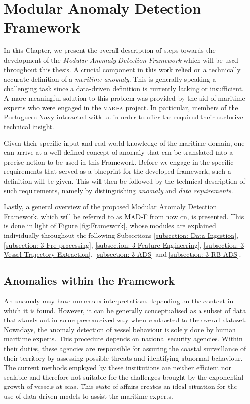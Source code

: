 \chapter{Modular Anomaly Detection Framework}
\label{chapter:Chapter 3}

In this Chapter, we present the overall description of steps towards the development of the \emph{Modular Anomaly Detection Framework} which will be used throughout this thesis. 
A crucial component in this work relied on a technically accurate definition of a \emph{maritime anomaly}. This is generally speaking a challenging task since a data-driven definition is currently lacking or insufficient. A more meaningful solution to this problem was provided by the aid of maritime experts who were engaged in the \textsc{marisa} project. In particular, members of the Portuguese Navy interacted with us in order to offer the required their exclusive technical insight.

Given their specific input and real-world knowledge of the maritime domain, one can arrive at a well-defined concept of anomaly that can be translated into a precise notion to be used in this Framework. Before we engage in the specific requirements that served as a blueprint for the developed framework, such a definition will be given. This will then be followed by the technical description of such requirements, namely by distinguishing \emph{anomaly} and \emph{data requirements}.

Lastly, a general overview of the proposed Modular Anomaly Detection Framework, which will be referred to as MAD-F from now on, is presented. This is done in light of Figure \ref{fig:Framework}, whose modules are explained individually throughout the following Subsections \ref{subsection: Data Ingestion}, \ref{subsection: 3 Pre-processing}, \ref{subsection: 3 Feature Engineering},  \ref{subsection: 3 Vessel Trajectory Extraction}, \ref{subsection: 3 ADS} and \ref{subsection: 3 RB-ADS}.


\section{Anomalies within the Framework}
\label{section: Framework Requirements}
An anomaly may have numerous interpretations depending on the context in which it is found. However, it can be generally conceptualised as a subset of data that stands out in some preconceived way when contrasted to the overall dataset. Nowadays, the anomaly detection of vessel behaviour is solely done by human maritime experts. This procedure depends on national security agencies. Within their duties, these agencies are responsible for assuring the coastal surveillance of their territory by assessing possible threats and identifying abnormal behaviour. The current methods employed by these institutions are neither efficient nor scalable and therefore not suitable for the challenges brought by the exponential growth of vessels at seas. This state of affairs creates an ideal situation for the use of data-driven models to assist the maritime experts.

